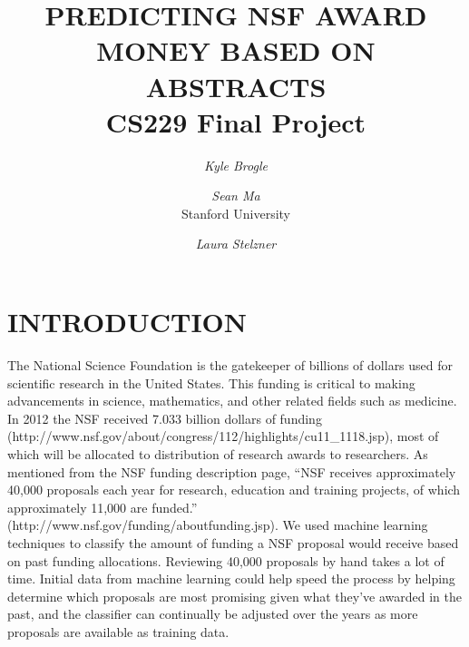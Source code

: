 \documentclass{article}
\begin{document}

\toappear{}



\title{PREDICTING NSF AWARD MONEY BASED ON ABSTRACTS\\ CS229 Final Project }


\author{{\em Kyle Brogle} \and {\em Sean Ma}\\ Stanford University \and {\em Laura Stelzner} }

\maketitle

\section{INTRODUCTION}
The National Science Foundation is the gatekeeper of  billions of dollars used for scientific research in the United States.  This funding is critical to making advancements in science, mathematics, and other related fields such as medicine.  In 2012 the NSF received 7.033 billion dollars of funding (http://www.nsf.gov/about/congress/112/highlights/cu11\_1118.jsp), most of which will be allocated to distribution of research awards to researchers.   As mentioned from the NSF funding description page, “NSF receives approximately 40,000 proposals each year for research, education and training projects, of which approximately 11,000 are funded.” (http://www.nsf.gov/funding/aboutfunding.jsp).   We used machine learning techniques to classify the amount of funding a NSF proposal would receive based on past funding allocations.  Reviewing 40,000 proposals by hand takes a lot of time.  Initial data from machine learning could help speed the process by helping determine which proposals are most promising given what they’ve awarded in the past, and the classifier can continually be adjusted over the years as more proposals are available as training data. \\
\end{document}
